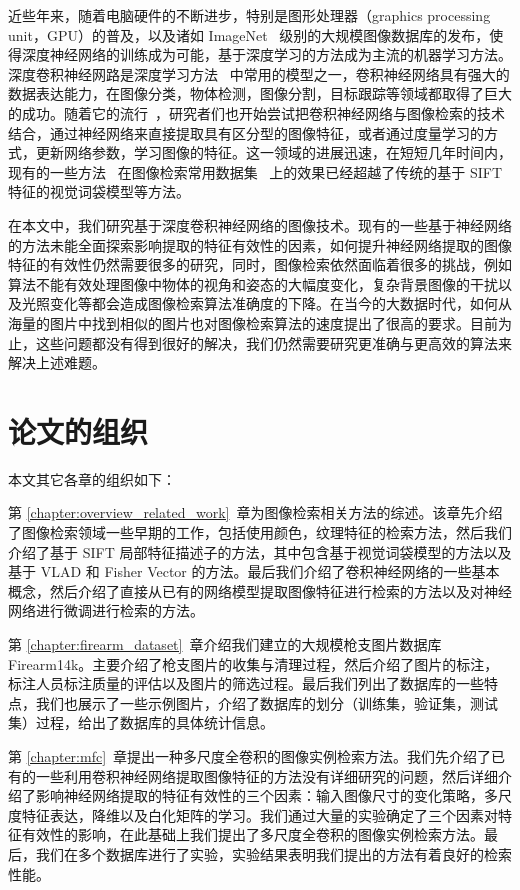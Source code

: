 近些年来，随着电脑硬件的不断进步，特别是图形处理器（graphics processing unit，GPU）的普及，以及诸如 ImageNet~\cite{Russakovsky2015ImageNetLS} 级别的大规模图像数据库的发布，使得深度神经网络的训练成为可能，基于深度学习的方法成为主流的机器学习方法。深度卷积神经网路是深度学习方法~\cite{lecun2015deep} 中常用的模型之一，卷积神经网络具有强大的数据表达能力，在图像分类，物体检测，图像分割，目标跟踪等领域都取得了巨大的成功。随着它的流行~\cite{Krizhevsky2012ImageNetCW}，研究者们也开始尝试把卷积神经网络与图像检索的技术结合，通过神经网络来直接提取具有区分型的图像特征，或者通过度量学习的方式，更新网络参数，学习图像的特征。这一领域的进展迅速，在短短几年时间内，现有的一些方法~\cite{Gordo2016DeepIR} 在图像检索常用数据集~\cite{Philbin2007ObjectRW,Philbin2008LostIQ,Nistr2006ScalableRW,Jgou2008HammingEA} 上的效果已经超越了传统的基于 SIFT 特征的视觉词袋模型等方法。

在本文中，我们研究基于深度卷积神经网络的图像技术。现有的一些基于神经网络的方法未能全面探索影响提取的特征有效性的因素，如何提升神经网络提取的图像特征的有效性仍然需要很多的研究，同时，图像检索依然面临着很多的挑战，例如算法不能有效处理图像中物体的视角和姿态的大幅度变化，复杂背景图像的干扰以及光照变化等都会造成图像检索算法准确度的下降。在当今的大数据时代，如何从海量的图片中找到相似的图片也对图像检索算法的速度提出了很高的要求。目前为止，这些问题都没有得到很好的解决，我们仍然需要研究更准确与更高效的算法来解决上述难题。

\section{论文的组织}
本文其它各章的组织如下：

第 \ref{chapter:overview_related_work}~章为图像检索相关方法的综述。该章先介绍了图像检索领域一些早期的工作，包括使用颜色，纹理特征的检索方法，然后我们介绍了基于 SIFT 局部特征描述子的方法，其中包含基于视觉词袋模型的方法以及基于 VLAD 和 Fisher Vector 的方法。最后我们介绍了卷积神经网络的一些基本概念，然后介绍了直接从已有的网络模型提取图像特征进行检索的方法以及对神经网络进行微调进行检索的方法。

第 \ref{chapter:firearm_dataset}~章介绍我们建立的大规模枪支图片数据库 Firearm14k。主要介绍了枪支图片的收集与清理过程，然后介绍了图片的标注，标注人员标注质量的评估以及图片的筛选过程。最后我们列出了数据库的一些特点，我们也展示了一些示例图片，介绍了数据库的划分（训练集，验证集，测试集）过程，给出了数据库的具体统计信息。

第 \ref{chapter:mfc}~章提出一种多尺度全卷积的图像实例检索方法。我们先介绍了已有的一些利用卷积神经网络提取图像特征的方法没有详细研究的问题，然后详细介绍了影响神经网络提取的特征有效性的三个因素：输入图像尺寸的变化策略，多尺度特征表达，降维以及白化矩阵的学习。我们通过大量的实验确定了三个因素对特征有效性的影响，在此基础上我们提出了多尺度全卷积的图像实例检索方法。最后，我们在多个数据库进行了实验，实验结果表明我们提出的方法有着良好的检索性能。

